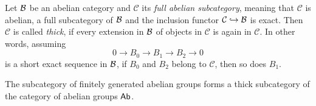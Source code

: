 \begin{definition}
    Let $\mathcal B$ be an abelian category and $\mathcal C$ its \emph{full abelian subcategory}, meaning that $\mathcal C$ is abelian, a full subcategory of $\mathcal B$ and the inclusion functor $\mathcal C \hookrightarrow \mathcal B$ is exact. Then $\mathcal C$ is called \emph{thick}, if every extension in $\mathcal B$ of objects in $\mathcal C$ is again in $\mathcal C$. In other words, assuming 
    \[
            0 \to B_0 \to B_1 \to B_2 \to 0
    \]
    is a short exact sequence in $\mathcal B$, if $B_0$ and $B_2$ belong to $\mathcal C$, then so does $B_1$.
    

\end{definition}

\begin{example}
    The subcategory of finitely generated abelian groups forms a thick subcategory of the category of abelian groups $\mathsf{Ab}$.
\end{example}

